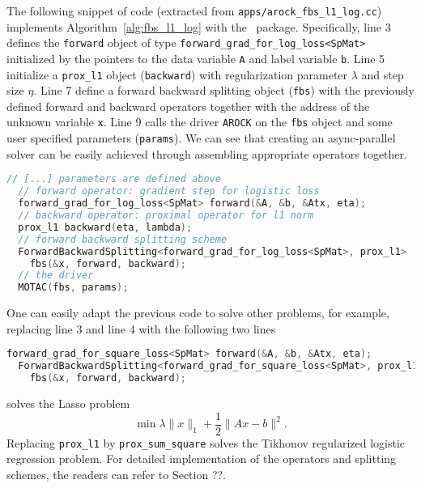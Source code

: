 The following snippet of code (extracted from 
\texttt{apps/arock\_fbs\_l1\_log.cc}) implements Algorithm~\ref{alg:fbs_l1_log} with the \pkg~package. 
Specifically, line 3 defines the \texttt{forward} object of type \texttt{forward\_grad\_for\_log\_loss<SpMat>} 
initialized by the pointers to the data variable \texttt{A} and label variable \texttt{b}. Line 5  initialize a 
\texttt{prox\_l1} object (\texttt{backward}) with regularization parameter $\lambda$ and step size $\eta$. 
Line 7 define a forward backward splitting object (\texttt{fbs}) with the previously defined forward and 
backward operators together with the address of the unknown variable \texttt{x}. Line 9 calls the driver 
\texttt{AROCK} on the \texttt{fbs} object and some user specified parameters (\texttt{params}). We can see
that creating an async-parallel solver can be easily achieved through assembling appropriate operators together.  
\begin{lstlisting}[language=C++]
  // [...] parameters are defined above
  // forward operator: gradient step for logistic loss
  forward_grad_for_log_loss<SpMat> forward(&A, &b, &Atx, eta);
  // backward operator: proximal operator for l1 norm 
  prox_l1 backward(eta, lambda);
  // forward backward splitting scheme
  ForwardBackwardSplitting<forward_grad_for_log_loss<SpMat>, prox_l1>
    fbs(&x, forward, backward);  
  // the driver
  MOTAC(fbs, params);  
\end{lstlisting}
One can easily adapt the previous code to solve other problems, for example, replacing line 3 and line 4 with
the following two lines
\begin{lstlisting}[language=C++]
  forward_grad_for_square_loss<SpMat> forward(&A, &b, &Atx, eta);
  ForwardBackwardSplitting<forward_grad_for_square_loss<SpMat>, prox_l1>
    fbs(&x, forward, backward);  
\end{lstlisting}
solves the Lasso problem
$$\min \lambda \|x\|_1 + \frac{1}{2} \|A x - b\|^2.$$
Replacing \texttt{prox\_l1} by \texttt{prox\_sum\_square} solves the Tikhonov regularized logistic regression problem.
For detailed implementation of the operators and splitting schemes, the readers can refer to Section ??.
